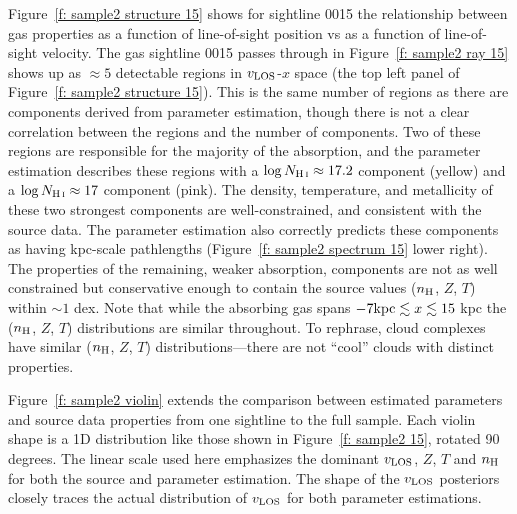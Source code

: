 \documentclass[fleqn,usenatbib]{mnras}
\begin{document}
Figure~\ref{f: sample2 structure 15} shows for sightline 0015 the relationship between gas properties as a function of line-of-sight position vs as a function of line-of-sight velocity.
The gas sightline 0015 passes through in Figure~\ref{f: sample2 ray 15} shows up as $\approx 5$ detectable regions in $v_{\rm LOS}$-$x$ space (the top left panel of Figure~\ref{f: sample2 structure 15}).
This is the same number of regions as there are components derived from parameter estimation,
though there is not a clear correlation between the regions and the number of components.
Two of these regions are responsible for the majority of the  absorption,
and the parameter estimation describes these regions with a $\log N_{\ion{H}{I}} \approx 17.2$ component (yellow) and a $\log N_{\ion{H}{I}} \approx 17$ component (pink).
The density, temperature, and metallicity of these two strongest components are well-constrained, and consistent with the source data.
The parameter estimation also correctly predicts these components as having kpc-scale pathlengths (Figure~\ref{f: sample2 spectrum 15} lower right).
The properties of the remaining, weaker absorption, components are not as well constrained but conservative enough to contain the source values ($n_{\rm H}$, $Z$, $T$) within $\sim 1$ dex.
Note that while the absorbing gas spans $-7 {\rm kpc} \lesssim x \lesssim 15$ kpc the ($n_{\rm H}$, $Z$, $T$) distributions are similar throughout.
To rephrase, cloud complexes have similar ($n_{\rm H}$, $Z$, $T$) distributions---there are not ``cool'' clouds with distinct properties.

Figure~\ref{f: sample2 violin} extends the comparison between estimated parameters and source data properties from one sightline to the full sample.
Each violin shape is a 1D distribution like those shown in Figure~\ref{f: sample2 15}, rotated 90 degrees.
The linear scale used here emphasizes the dominant $v_{\rm LOS}$, $Z$, $T$ and $n_{\rm H}$ for both the source and parameter estimation.
The shape of the $v_{\rm LOS}$ posteriors closely traces the actual distribution of $v_{\rm LOS}$ for both parameter estimations.
\end{document}
